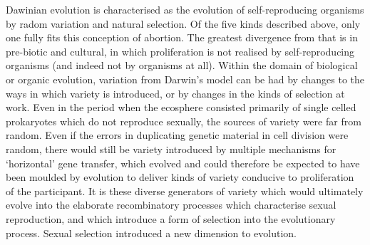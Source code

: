Dawinian evolution is characterised as the evolution of self-reproducing organisms by radom variation and natural selection.
Of the five kinds described above, only one fully fits this conception of abortion.
The greatest divergence from that is in pre-biotic and cultural, in which proliferation is not realised by self-reproducing organisms (and indeed not by organisms at all).
Within the domain of biological or organic evolution, variation from Darwin's model can be had by changes to the ways in which variety is introduced, or by changes in the kinds of selection at work.
Even in the period when the ecosphere consisted primarily of single celled prokaryotes which do not reproduce sexually, the sources of variety were far from random.
Even if the errors in duplicating genetic material in cell division were random, there would still be variety introduced by multiple mechanisms for `horizontal' gene transfer, which evolved and could therefore be expected to have been moulded by evolution to deliver kinds of variety conducive to proliferation of the participant.
It is these diverse generators of variety which would ultimately evolve into the elaborate recombinatory processes which characterise sexual reproduction, and which introduce a form of selection into the evolutionary process.
Sexual selection introduced a new dimension to evolution.


